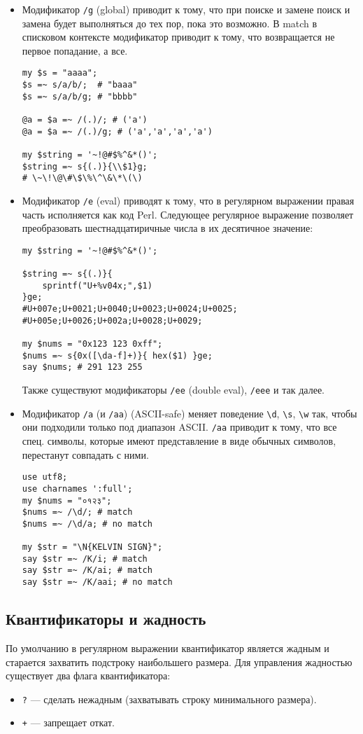 \begin{itemize}
\item Модификатор \verb|/g| (global) приводит к тому, что при поиске и замене поиск и замена будет выполняться до тех пор, пока это возможно. В match в списковом контексте модификатор приводит к тому, что возвращается не первое попадание, а все.
\begin{verbatim}
my $s = "aaaa";
$s =~ s/a/b/;  # "baaa"
$s =~ s/a/b/g; # "bbbb"

@a = $a =~ /(.)/; # ('a')
@a = $a =~ /(.)/g; # ('a','a','a','a')

my $string = '~!@#$%^&*()';
$string =~ s{(.)}{\\$1}g;
# \~\!\@\#\$\%\^\&\*\(\)
\end{verbatim}

\item Модификатор \verb|/e| (eval) приводят к тому, что в регулярном выражении правая часть исполняется как код Perl. Следующее регулярное выражение позволяет преобразовать шестнадцатиричные числа в их десятичное значение:
\begin{verbatim}
my $string = '~!@#$%^&*()';

$string =~ s{(.)}{
    sprintf("U+%v04x;",$1)
}ge;
#U+007e;U+0021;U+0040;U+0023;U+0024;U+0025;
#U+005e;U+0026;U+002a;U+0028;U+0029;

my $nums = "0x123 123 0xff";
$nums =~ s{0x([\da-f]+)}{ hex($1) }ge;
say $nums; # 291 123 255
\end{verbatim}
Также существуют модификаторы \verb|/ee| (double eval), \verb|/eee| и так далее. 

\item Модификатор \verb|/a| (и \verb|/aa|) (ASCII-safe) меняет поведение \verb|\d|, \verb|\s|, \verb|\w| так, чтобы они подходили только под диапазон ASCII. \verb|/aa| приводит к тому, что все спец. символы, которые имеют представление в виде обычных символов, перестанут совпадать с ними.
\begin{verbatim}
use utf8;
use charnames ':full';
my $nums = "०१२३";
$nums =~ /\d/; # match
$nums =~ /\d/a; # no match

my $str = "\N{KELVIN SIGN}";
say $str =~ /K/i; # match
say $str =~ /K/ai; # match
say $str =~ /K/aai; # no match
\end{verbatim}

\end{itemize}

\subsection{Квантификаторы и жадность} %
По умолчанию в регулярном выражении квантификатор является жадным и старается захватить подстроку наибольшего размера. Для управления жадностью существует два флага квантификатора:
\begin{itemize}
  \item \verb|?| --- сделать нежадным (захватывать строку минимального размера).
  \item \verb|+| --- запрещает откат.
\end{itemize}

